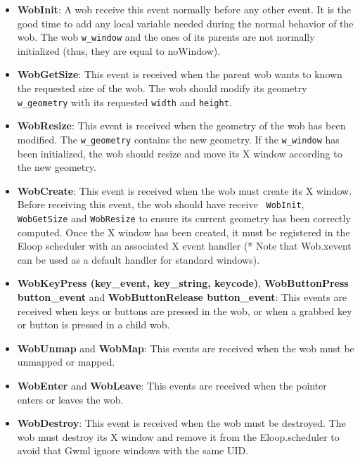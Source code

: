 \documentclass{book}
\begin{document}
\begin{itemize}
\item{\bf WobInit}: A wob receive this event normally before any other event.
  It is the good time to add any local variable needed during the normal
  behavior of the wob. The wob {\tt w\_window} and the ones of its parents
  are not normally initialized (thus, they are equal to noWindow).

\item{\bf WobGetSize}: This event is received when the parent wob wants to
known the requested size of the wob. The wob should modify its geometry
{\tt w\_geometry} with its requested {\tt width} and {\tt height}.

 \item{\bf WobResize}: This event is received when the geometry of the wob
has been modified. The {\tt w\_geometry} contains the new geometry. If the
{\tt w\_window} has been initialized, the wob should resize and move its X
window according to the new geometry.

 \item{\bf WobCreate}: This event is received when the wob must create its
X window. Before receiving this event, the wob should have receive {\tt
WobInit}, {\tt WobGetSize} and {\tt WobResize} to ensure its current
geometry has been correctly computed. Once the X window has been created,
it must be registered in the Eloop scheduler with an associated X event
handler (* Note that Wob.xevent can be used as a default handler for
standard windows).

 \item{\bf WobKeyPress (key\_event, key\_string, keycode)}, {\bf
WobButtonPress button\_event} and {\bf WobButtonRelease button\_event}:
This events are received when keys or buttons are pressed in the wob, or
when a grabbed key or button is pressed in a child wob.

\item{\bf WobUnmap} and {\bf WobMap}: This events are received when the 
wob must be unmapped or mapped.

 \item{\bf WobEnter} and {\bf WobLeave}: This events are received when the
pointer enters or leaves the wob.

\item{\bf WobDestroy}: This event is received when the wob must be destroyed.
The wob must destroy its X window and remove it from the Eloop.scheduler to
avoid that Gwml ignore windows with the same UID.


\end{itemize}
\end{document}
